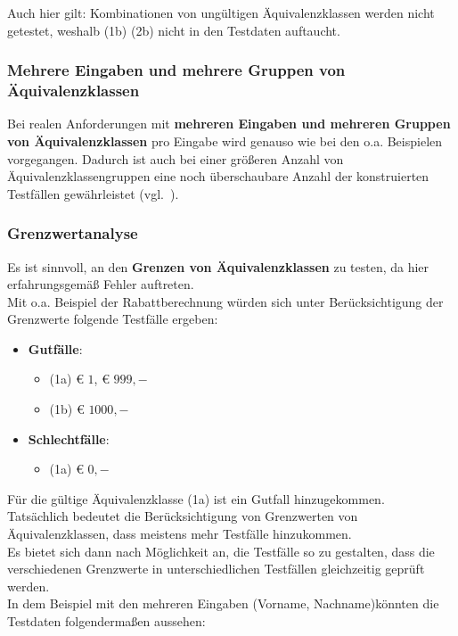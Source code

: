 \begin{tcolorbox}[colback=white]
    Auch hier gilt: Kombinationen von ungültigen Äquivalenzklassen werden nicht getestet, weshalb (1b) (2b) nicht in den Testdaten auftaucht.
\end{tcolorbox}

\subsubsection*{Mehrere Eingaben und mehrere Gruppen von Äquivalenzklassen}
Bei realen Anforderungen mit \textbf{mehreren Eingaben und mehreren Gruppen von Äquivalenzklassen} pro Eingabe wird genauso wie bei den o.a. Beispielen vorgegangen.
Dadurch ist auch bei einer größeren Anzahl von Äquivalenzklassengruppen eine noch überschaubare Anzahl der konstruierten  Testfällen gewährleistet (vgl.~\cite[45]{Wed09c}).

\subsubsection*{Grenzwertanalyse}
Es ist sinnvoll, an den \textbf{Grenzen von Äquivalenzklassen} zu testen, da hier erfahrungsgemäß Fehler auftreten.\\
Mit o.a. Beispiel der Rabattberechnung würden sich unter Berücksichtigung der Grenzwerte  folgende Testfälle ergeben:

\begin{itemize}
    \item \textbf{Gutfälle}:
    \begin{itemize}
        \item (1a) € $1$, € $999,-$
        \item (1b) € $1000,-$
    \end{itemize}
    \item \textbf{Schlechtfälle}:
    \begin{itemize}
        \item (1a) € $0,-$
    \end{itemize}
\end{itemize}

\noindent
Für die gültige Äquivalenzklasse (1a) ist ein Gutfall hinzugekommen.\\
Tatsächlich bedeutet die Berücksichtigung von Grenzwerten von Äquivalenzklassen, dass meistens mehr Testfälle hinzukommen.\\
Es bietet sich dann nach Möglichkeit an, die Testfälle so zu gestalten, dass die verschiedenen Grenzwerte in unterschiedlichen Testfällen gleichzeitig geprüft werden.\\
In dem Beispiel mit den mehreren Eingaben (Vorname, Nachname)könnten die Testdaten folgendermaßen aussehen:

